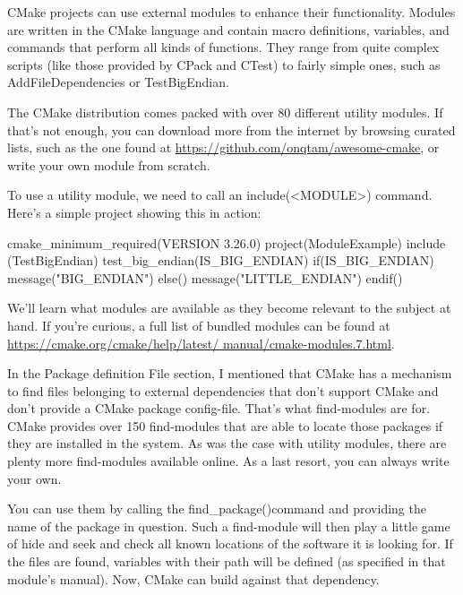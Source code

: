 
CMake projects can use external modules to enhance their functionality. Modules are written in the CMake language and contain macro definitions, variables, and commands that perform all kinds of functions. They range from quite complex scripts (like those provided by CPack and CTest) to fairly simple ones, such as AddFileDependencies or TestBigEndian.

The CMake distribution comes packed with over 80 different utility modules. If that’s not enough, you can download more from the internet by browsing curated lists, such as the one found at \url{https://github.com/onqtam/awesome-cmake}, or write your own module from scratch.

To use a utility module, we need to call an include(<MODULE>) command. Here’s a simple project showing this in action:


\begin{cmake}
cmake_minimum_required(VERSION 3.26.0)
project(ModuleExample)
include (TestBigEndian)
test_big_endian(IS_BIG_ENDIAN)
if(IS_BIG_ENDIAN)
message("BIG_ENDIAN")
else()
message("LITTLE_ENDIAN")
endif()
\end{cmake}

We’ll learn what modules are available as they become relevant to the subject at hand. If you’re curious, a full list of bundled modules can be found at \url{https://cmake.org/cmake/help/latest/ manual/cmake-modules.7.html}.


In the Package definition File section, I mentioned that CMake has a mechanism to find files belonging to external dependencies that don’t support CMake and don’t provide a CMake package config-file. That’s what find-modules are for. CMake provides over 150 find-modules that are able to locate those packages if they are installed in the system. As was the case with utility modules, there are plenty more find-modules available online. As a last resort, you can always write your own.

You can use them by calling the find\_package()command and providing the name of the package in question. Such a find-module will then play a little game of hide and seek and check all known locations of the software it is looking for. If the files are found, variables with their path will be defined (as specified in that module’s manual). Now, CMake can build against that dependency.

